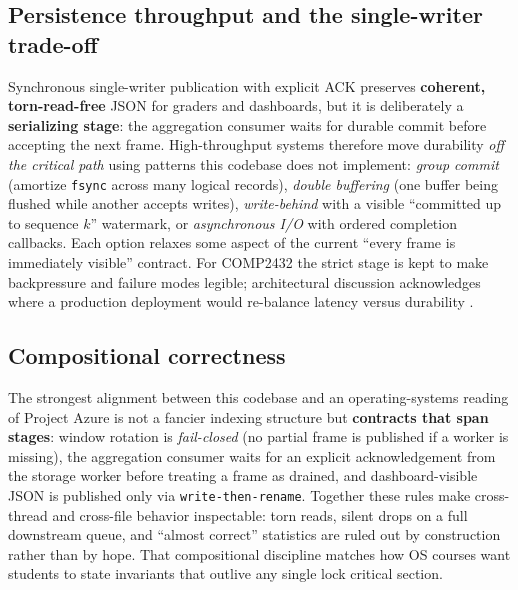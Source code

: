\documentclass[11pt]{article}
\begin{document}
\subsection*{Persistence throughput and the single-writer trade-off}
Synchronous single-writer publication with explicit ACK preserves \textbf{coherent, torn-read-free} JSON for graders and dashboards, but it is deliberately a \textbf{serializing stage}: the aggregation consumer waits for durable commit before accepting the next frame. High-throughput systems therefore move durability \emph{off the critical path} using patterns this codebase does not implement: \emph{group commit} (amortize \texttt{fsync} across many logical records), \emph{double buffering} (one buffer being flushed while another accepts writes), \emph{write-behind} with a visible ``committed up to sequence $k$'' watermark, or \emph{asynchronous I/O} with ordered completion callbacks. Each option relaxes some aspect of the current ``every frame is immediately visible'' contract. For COMP2432 the strict stage is kept to make backpressure and failure modes legible; architectural discussion acknowledges where a production deployment would re-balance latency versus durability \cite{kleppmann2017}.

\subsection*{Compositional correctness }
The strongest alignment between this codebase and an operating-systems reading of Project Azure is not a fancier indexing structure but \textbf{contracts that span stages}: window rotation is \emph{fail-closed} (no partial frame is published if a worker is missing), the aggregation consumer waits for an explicit acknowledgement from the storage worker before treating a frame as drained, and dashboard-visible JSON is published only via \texttt{write-then-rename}. Together these rules make cross-thread and cross-file behavior inspectable: torn reads, silent drops on a full downstream queue, and ``almost correct'' statistics are ruled out by construction rather than by hope. That compositional discipline matches how OS courses want students to state invariants that outlive any single lock critical section.
\end{document}
